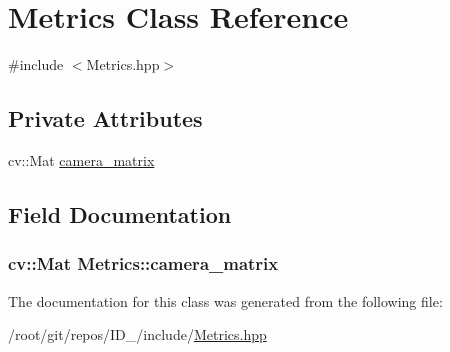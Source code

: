 \hypertarget{classMetrics}{\section{\-Metrics \-Class \-Reference}
\label{classMetrics}
}


{\ttfamily \#include $<$\-Metrics.\-hpp$>$}

\subsection*{\-Private \-Attributes}
\begin{DoxyCompactItemize}
\item 
cv\-::\-Mat \hyperlink{classMetrics_aba72e7e31eb9057d1252e61cdf3aa904}{camera\-\_\-matrix}
\end{DoxyCompactItemize}


\subsection{\-Field \-Documentation}
\hypertarget{classMetrics_aba72e7e31eb9057d1252e61cdf3aa904}{
\subsubsection[{camera\-\_\-matrix}]{\setlength{\rightskip}{0pt plus 5cm}cv\-::\-Mat {\bf \-Metrics\-::camera\-\_\-matrix}}}\label{classMetrics_aba72e7e31eb9057d1252e61cdf3aa904}


\-The documentation for this class was generated from the following file\-:\begin{DoxyCompactItemize}
\item 
/root/git/repos/\-I\-D\-\_/include/\hyperlink{Metrics_8hpp}{\-Metrics.\-hpp}\end{DoxyCompactItemize}
